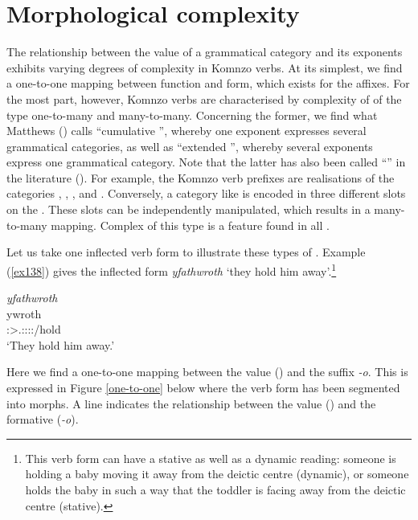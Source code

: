 \section{Morphological complexity} \label{verbprelim}

The relationship between the value of a grammatical category and its exponents exhibits varying degrees of complexity in Komnzo verbs. At its simplest, we find a one-to-one mapping between function and form, which exists for the  affixes. For the most part, however, Komnzo verbs are characterised by complexity of  of the type one-to-many and many-to-many. Concerning the former, we find what Matthews (\citeyear[147-149]{Matthews:1979vm}) calls ``cumulative '', whereby one exponent expresses several grammatical categories, as well as ``extended '', whereby several exponents express one grammatical category. Note that the latter has also been called ``'' in the literature (\citealt[163]{Caballero:2012vr}). For example, the Komnzo verb prefixes are  realisations of the categories , , ,  and . Conversely, a category like  is encoded in three different slots on the . These slots can be independently manipulated, which results in a many-to-many mapping. Complex  of this type is a feature found in all .%

Let us take one inflected verb form to illustrate these types of . Example (\ref{ex138}) gives the inflected  form \emph{yfathwroth} `they hold him away'.\footnote{This verb form can have a stative as well as a dynamic reading: someone is holding a baby moving it away from the deictic centre (dynamic), or someone holds the baby in such a way that the toddler is facing away from the deictic centre (stative).}

\begin{exe}
	\ex \emph{yfathwroth}\\
	\gll ywroth\\
	\Stpl:\Sbj>\Tsg.\Masc:\Obj:\Nonpast:\Ipfv:\Andat/hold\\
	\trans `They hold him away.'
	\label{ex138}
\end{exe}

Here we find a one-to-one mapping between the  value () and the suffix \emph{-o}. This is expressed in Figure \ref{one-to-one} below where the verb form has been segmented into morphs. A line indicates the  relationship between the value (\Andat) and the formative (\emph{-o}).

